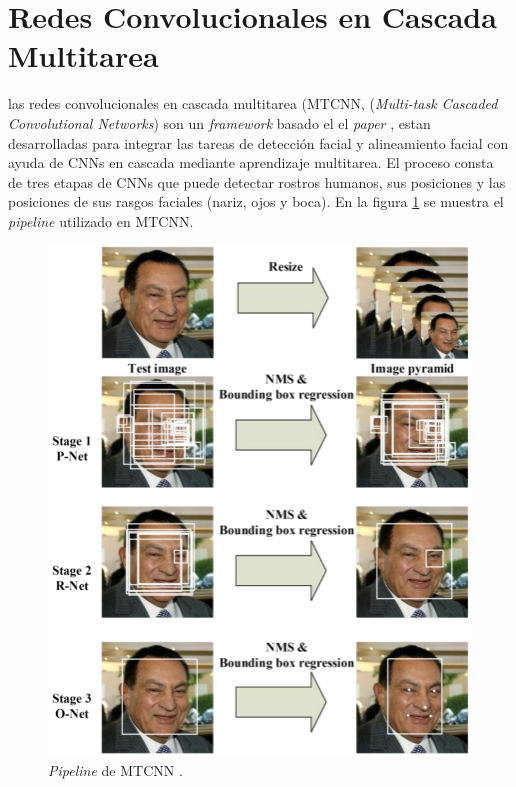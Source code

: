 \section{Redes Convolucionales en Cascada Multitarea}
las redes convolucionales en cascada multitarea (MTCNN, (\textit{Multi-task Cascaded Convolutional Networks}) son un \textit{framework} basado el el \textit{paper} \cite{mtcnn_info}, estan desarrolladas para integrar las tareas de detección facial y alineamiento facial con ayuda de CNNs en cascada mediante aprendizaje multitarea. El proceso consta de tres etapas de CNNs que puede detectar rostros humanos, sus posiciones y las posiciones de sus rasgos faciales (nariz, ojos y boca). En la figura \ref{fig:mtcnn_pipe} se muestra el \textit{pipeline} utilizado en MTCNN.

\begin{figure}[h]
	\centering
	\includegraphics[scale=0.5]{./Figures/mtcnn_pipe.png}
	\caption{\textit{Pipeline} de MTCNN \cite{mtcnn_info}.}
	\label{fig:mtcnn_pipe}
\end{figure}

